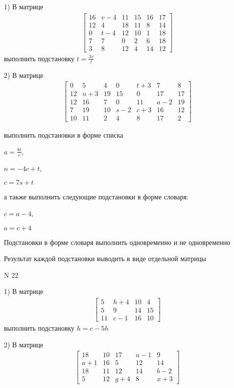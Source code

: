 \documentclass[11pt]{report}
\begin{document}
    1) В матрице
\begin{align*}
\left[\begin{matrix}16 & v - 4 & 11 & 15 & 16 & 17\\12 & 4 & 18 & 11 & 8 & 14\\0 & t - 4 & 12 & 10 & 1 & 18\\7 & 7 & 0 & 2 & 6 & 18\\3 & 8 & 12 & 4 & 14 & 12\end{matrix}\right]
\end{align*}
выполнить подстановку $t=\frac{3 v}{t}$


    2) В матрице
\begin{align*}
\left[\begin{matrix}0 & 5 & 4 & 0 & t + 3 & 7 & 8\\12 & n + 3 & 19 & 15 & 0 & 17 & 17\\12 & 16 & 7 & 0 & 11 & a - 2 & 19\\7 & 19 & 10 & s - 2 & c + 3 & 16 & 12\\10 & 11 & 2 & 4 & 8 & 17 & 2\end{matrix}\right]
\end{align*}

выполнить подстановки в форме списка

$a=\frac{8 t}{c}$,

$n=- 4 c + t$,

$c=7 s + t$

а также выполнить следующие подстановки в форме словаря:

$c=a - 4$,

$a=c + 4$


    Подстановки в форме словаря выполнить одновременно и не одновременно


    Результат каждой подстановки выводить в виде отдельной матрицы

\newpage
N 22


    1) В матрице
\begin{align*}
\left[\begin{matrix}5 & h + 4 & 10 & 4\\5 & 9 & 14 & 15\\11 & c - 1 & 16 & 10\end{matrix}\right]
\end{align*}
выполнить подстановку $h=c - 5 h$


    2) В матрице
\begin{align*}
\left[\begin{matrix}18 & 10 & 17 & u - 1 & 9\\a + 1 & 16 & 5 & 12 & 14\\18 & 11 & 12 & 14 & b - 2\\5 & 12 & g + 4 & 8 & x + 3\end{matrix}\right]
\end{align*}
\end{document}
